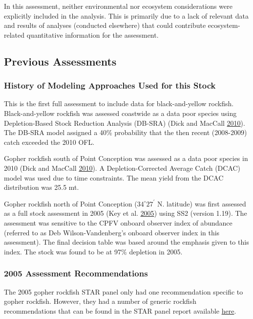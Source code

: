 \documentclass[12pt,]{article}
\begin{document}
In this assessment, neither environmental nor ecosystem considerations
were explicitly included in the analysis. This is primarily due to a
lack of relevant data and results of analyses (conducted elsewhere) that
could contribute ecosystem-related quantitative information for the
assessment.

\subsection{Previous Assessments}\label{previous-assessments}

\subsubsection{History of Modeling Approaches Used for this
Stock}\label{history-of-modeling-approaches-used-for-this-stock}

This is the first full assessment to include data for black-and-yellow
rockfish. Black-and-yellow rockfish was assessed coastwide as a data
poor species using Depletion-Based Stock Reduction Analysis (DB-SRA)
(Dick and MacCall \protect\hyperlink{ref-Dick2010}{2010}). The DB-SRA
model assigned a 40\% probability that the then recent (2008-2009) catch
exceeded the 2010 OFL.

Gopher rockfish south of Point Conception was assessed as a data poor
species in 2010 (Dick and MacCall
\protect\hyperlink{ref-Dick2010}{2010}). A Depletion-Corrected Average
Catch (DCAC) model was used due to time constraints. The mean yield from
the DCAC distribution was 25.5 mt.

Gopher rockfish north of Point Conception (\(34^\circ 27^\prime\) N.
latitude) was first assessed as a full stock assessment in 2005 (Key et
al. \protect\hyperlink{ref-Key2005}{2005}) using SS2 (version 1.19). The
assessment was sensitive to the CPFV onboard observer index of abundance
(referred to as Deb Wilson-Vandenberg's onboard observer index in this
assessment). The final decision table was based around the emphasis
given to this index. The stock was found to be at 97\% depletion in
2005.

\subsubsection{2005 Assessment
Recommendations}\label{assessment-recommendations}

The 2005 gopher rockfish STAR panel only had one recommendation specific
to gopher rockfish. However, they had a number of generic rockfish
recommendations that can be found in the STAR panel report available
\href{https://www.pcouncil.org/groundfish/stock-assessments/by-species/gopher-rockfish/}{here}.
\end{document}
